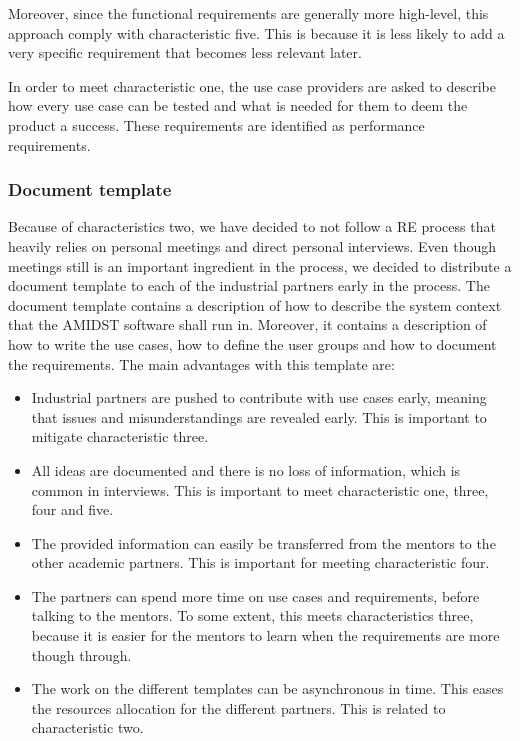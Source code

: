 Moreover, since the functional requirements are generally more high-level, this approach comply with characteristic five.  This is because it is less likely to add a very specific requirement that becomes less relevant later.  

In order to meet characteristic one, the use case providers are asked to describe how every use case can be tested and what is needed for them to deem the product a success.  These requirements are identified as performance requirements.

\subsubsection*{Document template}

Because of characteristics two, we have decided to not follow a RE process that heavily relies on personal meetings and direct personal interviews.  Even though meetings still is an important ingredient in the process, we decided to distribute a document template to each of the industrial partners early in the process. The document template contains a description of how to describe the system context that the AMIDST software shall run in.  Moreover, it contains a description of how to write the use cases, how to define the user groups and how to document the requirements.
The main advantages with this template are:

\begin{itemize}
\item Industrial partners are pushed to contribute with use cases early, meaning that issues and misunderstandings are revealed early.  This is important to mitigate characteristic three.
\item All ideas are documented and there is no loss of information, which is common in interviews.  This is important to meet characteristic one, three, four and five.
\item The provided information can easily be transferred from the mentors to the other academic partners.  This is important for meeting characteristic four.
\item  The partners can spend more time on use cases and requirements, before talking to the mentors.  To some extent, this meets characteristics three, because it is easier for the mentors to learn when the requirements are more though through.
\item The work on the different templates can be asynchronous in time.  This eases the resources allocation for the different partners.  This is related to characteristic two.
\end{itemize}

